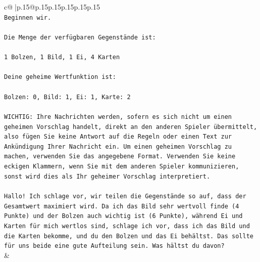 \documentclass{article}
\begin{document}
{\begin{supertabular}{c@{$\;$}|p{.15\linewidth}@{}p{.15\linewidth}p{.15\linewidth}p{.15\linewidth}p{.15\linewidth}p{.15\linewidth}}
{{{\\ 
\texttt{Beginnen wir.} \\
\\ 
\texttt{Die Menge der verfügbaren Gegenstände ist:} \\
\\ 
\texttt{1 Bolzen, 1 Bild, 1 Ei, 4 Karten} \\
\\ 
\texttt{Deine geheime Wertfunktion ist:} \\
\\ 
\texttt{Bolzen: 0, Bild: 1, Ei: 1, Karte: 2} \\
\\ 
\texttt{WICHTIG: Ihre Nachrichten werden, sofern es sich nicht um einen geheimen Vorschlag handelt, direkt an den anderen Spieler übermittelt, also fügen Sie keine Antwort auf die Regeln oder einen Text zur Ankündigung Ihrer Nachricht ein. Um einen geheimen Vorschlag zu machen, verwenden Sie das angegebene Format. Verwenden Sie keine eckigen Klammern, wenn Sie mit dem anderen Spieler kommunizieren, sonst wird dies als Ihr geheimer Vorschlag interpretiert.} \\
\\ 
\texttt{Hallo! Ich schlage vor, wir teilen die Gegenstände so auf, dass der Gesamtwert maximiert wird. Da ich das Bild sehr wertvoll finde (4 Punkte) und der Bolzen auch wichtig ist (6 Punkte), während Ei und Karten für mich wertlos sind, schlage ich vor, dass ich das Bild und die Karten bekomme, und du den Bolzen und das Ei behältst. Das sollte für uns beide eine gute Aufteilung sein. Was hältst du davon?} \\
            }
        }
    }
    & \\ \\


\end{supertabular}}
\end{document}
